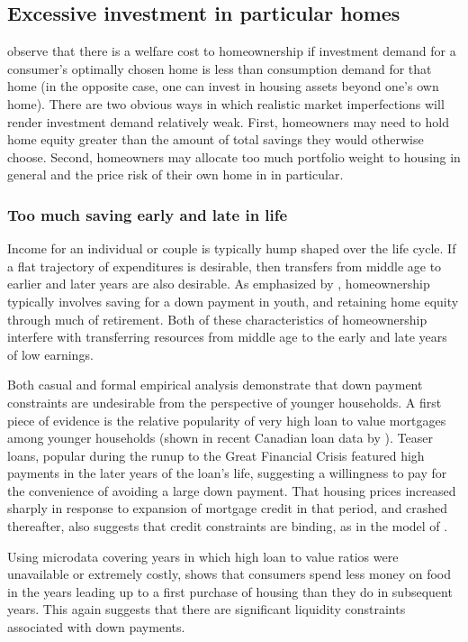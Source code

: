 \documentclass[12pt]{article}
\begin{document}
\subsection{Excessive investment in particular homes}

\textcite{HendersonIoannides} observe that there is a welfare cost to homeownership
if investment demand for a consumer's optimally chosen home is less than
consumption demand for that home (in the opposite case, one can invest in
housing assets beyond one's own home). There are two obvious ways in which
realistic market imperfections will render investment demand relatively weak.
First, homeowners may need to hold home equity greater than the amount of total
savings they would otherwise choose. Second, homeowners may allocate too much
portfolio weight to housing in general and the price risk of their own home in
in particular.

\subsubsection{Too much saving early and late in life}

Income for an individual or couple is typically hump shaped over the life cycle.
If a flat trajectory of expenditures is desirable, then transfers from middle
age to earlier and later years are also desirable.  As emphasized by
\textcite{ArtleVaraiya}, homeownership typically involves saving for a down payment
in youth, and retaining home equity through much of retirement.  Both of these
characteristics of homeownership interfere with transferring resources from
middle age to the early and late years of low earnings.

Both casual and formal empirical analysis demonstrate that down payment
constraints are undesirable from the perspective of younger households.  A
first piece of evidence is the relative popularity of very high loan to value
mortgages among younger households (shown in recent Canadian loan data by
\textcite{AlAboud2025}). Teaser loans, popular during the runup to the Great
Financial Crisis featured high payments in the later years of the loan's life,
suggesting a willingness to pay for the convenience of avoiding a large down
payment. That housing prices increased sharply in response to expansion of
mortgage credit in that period, and crashed thereafter, also suggests that
credit constraints are binding, as in the model of \textcite{OrtaloMagneRady}.  

Using microdata covering years in which high loan to value ratios were
unavailable or extremely costly, \textcite{Engelhardt96} shows that consumers spend
less money on food in the years leading up to a first purchase of housing than
they do in subsequent years. This again suggests that there are significant
liquidity constraints associated with down payments.
\end{document}
